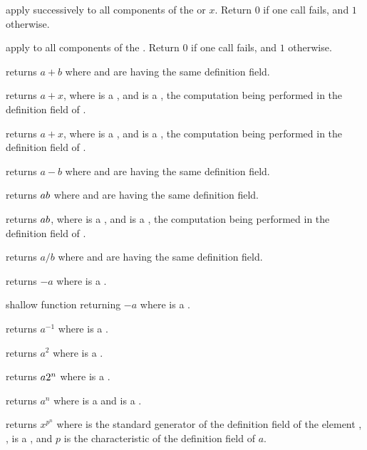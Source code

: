  apply  successively to all
components of the  or  $x$. Return $0$ if one call fails,
and $1$ otherwise.

 apply  to all components
of the . Return $0$ if one call fails, and $1$ otherwise.

 returns $a+b$ where  and  are
 having the same definition field.

 returns $a+x$, where  is a
, and  is a , the computation being
performed in the definition field of .

 returns $a+x$, where  is a
, and  is a , the computation being
performed in the definition field of .

 returns $a-b$ where  and  are
 having the same definition field.

 returns $a\*b$ where  and  are
 having the same definition field.

 returns $a\*b$, where  is a
, and  is a , the computation being
performed in the definition field of .

 returns $a/b$ where  and  are
 having the same definition field.

 returns $-a$ where  is a .

 shallow function returning $-a$ where  is a
.

 returns $a^{-1}$ where  is a .

 returns $a^2$ where  is a .

 returns $a\*2^n$ where  is a
.

 returns $a^n$ where  is a 
and  is a .

 returns $x^{p^n}$ where  is
the standard generator of the definition field of the  element
, ,  is a , and $p$ is the characteristic
of the definition field of $a$.

